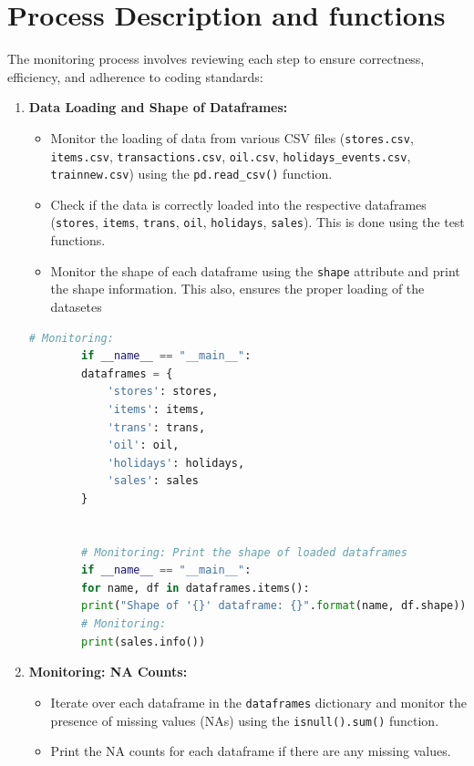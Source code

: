 \section{Process Description and functions}

The monitoring process involves reviewing each step to ensure correctness, efficiency, and adherence to coding standards:

\begin{enumerate}
	\item \textbf{Data Loading and Shape of Dataframes:}
	\begin{itemize}
		\item Monitor the loading of data from various CSV files (\texttt{stores.csv}, \texttt{items.csv}, \texttt{transactions.csv}, \texttt{oil.csv}, \texttt{holidays\_events.csv}, \texttt{trainnew.csv}) using the \texttt{pd.read\_csv()} function.
		\item Check if the data is correctly loaded into the respective dataframes (\texttt{stores}, \texttt{items}, \texttt{trans}, \texttt{oil}, \texttt{holidays}, \texttt{sales}). This is done using the test functions.
		\item Monitor the shape of each dataframe using the \texttt{shape} attribute and print the shape information. This also, ensures the proper loading of the datasetes
	\end{itemize}
	
	\begin{lstlisting}[language=Python]
		# Monitoring:
		if __name__ == "__main__":
		dataframes = {
			'stores': stores,
			'items': items,
			'trans': trans,
			'oil': oil,
			'holidays': holidays,
			'sales': sales
		}
		
		
		# Monitoring: Print the shape of loaded dataframes
		if __name__ == "__main__":
		for name, df in dataframes.items():
		print("Shape of '{}' dataframe: {}".format(name, df.shape))
		# Monitoring:
		print(sales.info())
	\end{lstlisting}
	
	
	\item \textbf{Monitoring: NA Counts:}
	\begin{itemize}
		\item Iterate over each dataframe in the \texttt{dataframes} dictionary and monitor the presence of missing values (NAs) using the \texttt{isnull().sum()} function.
		\item Print the NA counts for each dataframe if there are any missing values.
	\end{itemize}
	

\end{enumerate}
